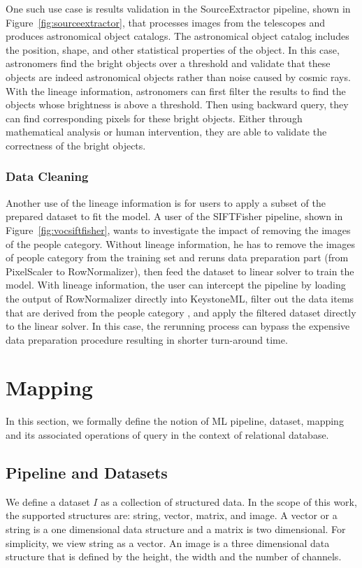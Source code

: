 \documentclass{sig-alternate}
\begin{document}
One such use case is results validation in the SourceExtractor pipeline, shown in Figure~\ref{fig:sourceextractor},
that processes images from the telescopes and produces astronomical object catalogs. 
The astronomical object catalog includes the position, shape, and other statistical properties of the object.
In this case, astronomers find the bright objects over a threshold and validate that these objects are indeed astronomical objects rather
than noise caused by cosmic rays.
With the lineage information, astronomers can first filter the results to find the objects whose brightness is above a threshold.
Then using backward query, they can find corresponding pixels for these bright objects. 
Either through mathematical analysis or human intervention, they are able to validate the correctness of the bright objects.

\subsubsection{Data Cleaning}
Another use of the lineage information is for users to apply a subset of the prepared dataset to fit the model. 
A user of the SIFTFisher pipeline, shown in Figure~\ref{fig:vocsiftfisher}, wants to investigate the impact of removing the images
of the people category.
Without lineage information, he has to remove the images of people category from the training set and reruns data
preparation part (from PixelScaler to RowNormalizer), then feed the dataset to linear solver to train the model.
With lineage information, the user can intercept the pipeline by loading the output of RowNormalizer directly into KeystoneML,
filter out the data items that are derived from the people category , and apply the filtered dataset directly to the linear solver.
In this case, the rerunning process can bypass the expensive data preparation procedure resulting in shorter turn-around time.

\section{Mapping}
\label{sec:Mapping}
In this section, we formally define the notion of ML pipeline, dataset, mapping and its associated operations of query in the context of 
relational database.

\subsection{Pipeline and Datasets}
\label{sec:Map-Pipe-Data}
We define a dataset $I$ as a collection of structured data. In the scope of this work, the supported structures are: 
string, vector, matrix, and image. A vector or a string is a one dimensional data structure and a matrix is two dimensional. 
For simplicity, we view string as a vector.
An image is a three dimensional data structure that is defined by the height, the width and the number
of channels. 
\end{document}
